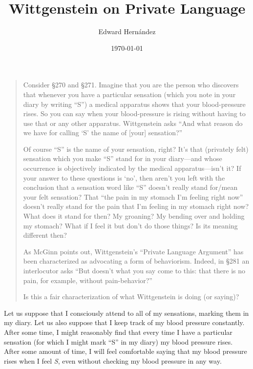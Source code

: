\documentclass[man,12pt,natbib]{apa6}
\begin{document}
\title{Wittgenstein on Private Language}
\author{Edward Hern\'{a}ndez}
\date{\today}

\maketitle

\begin{quote}
	Consider \S 270 and \S 271.  Imagine that you are the person who discovers
	that whenever you have a particular sensation (which you note in your diary
	by writing ``S'') a medical apparatus shows that your blood-pressure rises.
	So you can say when your blood-pressure is rising without having to use
	that or any other apparatus. Wittgenstein asks ``And what reason do we have
	for calling `S' the name of [your] sensation?''

	Of course ``S'' is the name of your sensation, right?  It's that (privately
	felt) sensation which you make ``S'' stand for in your diary---and whose
	occurrence is objectively indicated by the medical apparatus---isn't it?
	If your answer to these questions is `no', then aren't you left with the
	conclusion that a sensation word like ``S'' doesn't really stand for/mean
	your felt sensation?  That ``the pain in my stomach I'm feeling right now''
	doesn't really stand for the pain that I'm feeling in my stomach right now?
	What does it stand for then?  My groaning?  My bending over and holding my
	stomach?  What if I feel it but don't do those things?  Is its meaning
	different then?

	As McGinn points out, Wittgenstein's ``Private Language Argument'' has been
	characterized as advocating a form of behaviorism.  Indeed, in \S 281 an
	interlocutor asks ``But doesn't what you say come to this: that there is no
	pain, for example, without pain-behavior?''

	Is this a fair characterization of what Wittgenstein is doing (or saying)?
\end{quote}
\clearpage

Let us suppose that I consciously attend to all of my sensations, marking them
in my diary.
Let us also suppose that I keep track of my blood pressure constantly. After
some time, I might reasonably find that every time I have a particular
sensation (for which I might mark ``S'' in my diary) my blood pressure rises.
After some amount of time, I will feel comfortable saying that my blood
pressure rises when I feel \textit{S},
%
even without checking my blood pressure in any way.
\end{document}
